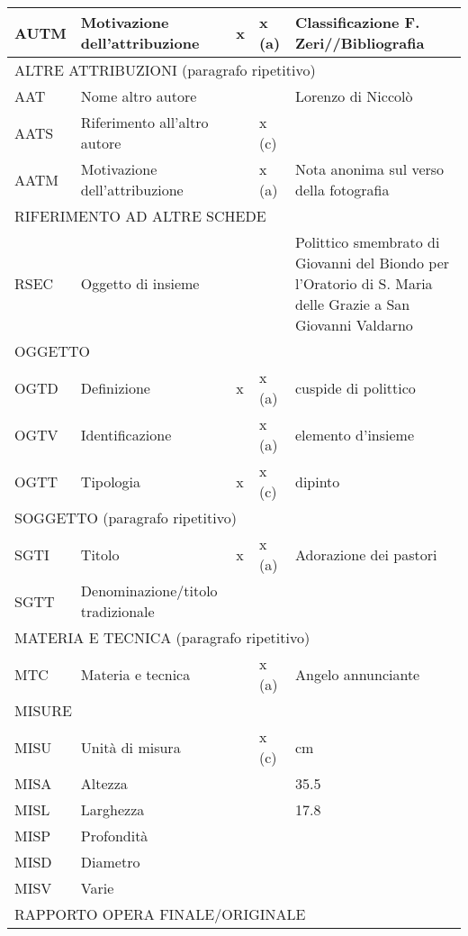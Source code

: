 \begin{center}
\begin{longtable}{ | p{1cm} | p{4cm} | p{.6cm} | p{.6cm} | p{5cm} | }
  AUTM & Motivazione dell’attribuzione & x & x (a) & Classificazione F. Zeri//Bibliografia \\ \hline
  \multicolumn{5}{|l|}{\cellcolor{lightcyan}ALTRE ATTRIBUZIONI (paragrafo ripetitivo)}  \\ \hline
  AAT & Nome altro autore &  &  & Lorenzo di Niccolò  \\ \hline
  AATS & Riferimento all’altro autore &  & x (c) &   \\ \hline
  AATM & Motivazione dell’attribuzione &  & x (a) & Nota anonima sul verso della fotografia  \\ \hline
  \multicolumn{5}{|l|}{\cellcolor{lightcyan}RIFERIMENTO AD ALTRE SCHEDE}  \\ \hline
  RSEC & Oggetto di insieme &  &  & Polittico smembrato di Giovanni del Biondo per l'Oratorio di S. Maria delle Grazie a San Giovanni Valdarno  \\ \hline
  \multicolumn{5}{|l|}{\cellcolor{lightcyan}OGGETTO}  \\ \hline
  OGTD & Definizione & x & x (a) & cuspide di polittico  \\ \hline
  OGTV & Identificazione &  & x (a) & elemento d'insieme  \\ \hline
  OGTT & Tipologia & x & x (c) & dipinto  \\ \hline
  \multicolumn{5}{|l|}{\cellcolor{lightcyan}SOGGETTO  (paragrafo ripetitivo)}  \\ \hline
  SGTI & Titolo & x & x (a) & Adorazione dei pastori  \\ \hline
  SGTT & Denominazione/titolo tradizionale &  &  &   \\ \hline
  \multicolumn{5}{|l|}{\cellcolor{lightcyan}MATERIA E TECNICA (paragrafo ripetitivo)}  \\ \hline
  MTC & Materia e tecnica &  & x (a) & Angelo annunciante  \\ \hline
  \multicolumn{5}{|l|}{\cellcolor{lightcyan}MISURE} \\ \hline
  MISU & Unità di misura &  & x (c) & cm  \\ \hline
  MISA & Altezza &  &  & 35.5  \\ \hline
  MISL & Larghezza &  &  & 17.8  \\ \hline
  MISP & Profondità &  &  &   \\ \hline
  MISD & Diametro &  &  &   \\ \hline
  MISV & Varie &  &  &   \\ \hline
  \multicolumn{5}{|l|}{\cellcolor{lightcyan}RAPPORTO OPERA FINALE/ORIGINALE}  \\ \hline

\end{longtable}
\end{center}
